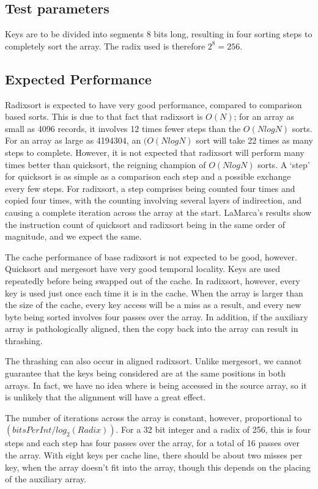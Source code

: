\subsection{Test parameters}
Keys are to be divided into segments 8 bits long, resulting in four sorting
steps to completely sort the array. The radix used is therefore $2^8 = 256$.

\subsection{Expected Performance}
Radixsort is expected to have very good performance, compared to comparison
based sorts. This is due to that fact that radixsort is $O(N)$; for an array as
small as 4096 records, it involves 12 times fewer steps than the $O(NlogN)$
sorts. For an array as large as 4194304, an $(O(NlogN)$ sort will take 22 times
as many steps to complete. However, it is not expected that radixsort will
perform many times better than quicksort, the reigning champion of $O(NlogN)$
sorts. A `step' for quicksort is as simple as a comparison each step and a
possible exchange every few steps.  For radixsort, a step comprises being
counted four times and copied four times, with the counting involving several
layers of indirection, and causing a complete iteration across the array at the
start. LaMarca's results show the instruction count of quicksort and radixsort
being in the same order of magnitude, and we expect the same.

The cache performance of base radixsort is not expected to be good, however.
Quicksort and mergesort have very good temporal locality. Keys are
used repeatedly before being swapped out of the cache. In radixsort, however,
every key is used just once each time it is in the cache. When the array is larger than
the size of the cache, every key access will be a miss as a result, and every
new byte being sorted involves four passes over the array. In addition, if the
auxiliary array is pathologically aligned, then the copy back into the array
can result in thrashing.

The thrashing can also occur in aligned radixsort. Unlike mergesort, we cannot
guarantee that the keys being considered are at the same positions in both
arrays. In fact, we have no idea where is being accessed in the source array, so
it is unlikely that the alignment will have a great effect.

The number of iterations across the array is constant, however, proportional to
$(bitsPerInt/log_2(Radix))$. For a 32 bit integer and a radix of 256, this is
four steps and each step has four passes over the array, for a total of 16
passes over the array.  With eight keys per cache line, there should be about
two misses per key, when the array doesn't fit into the array, though this
depends on the placing of the auxiliary array.

